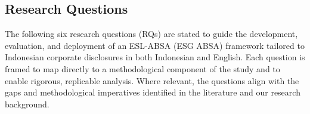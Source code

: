\subsection{Research Questions}

The following six research questions (RQs) are stated to guide the development, evaluation, and deployment of an ESL-ABSA (ESG ABSA) framework tailored to Indonesian corporate disclosures in both Indonesian and English. Each question is framed to map directly to a methodological component of the study and to enable rigorous, replicable analysis. Where relevant, the questions align with the gaps and methodological imperatives identified in the literature and our research background.


